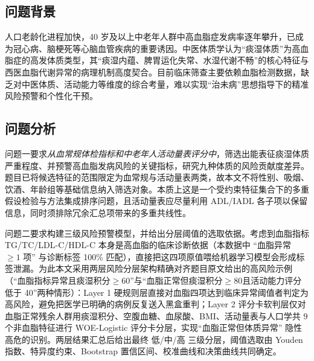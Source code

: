 \documentclass{MathorCupmodeling}
\begin{document}
\subsection{问题背景}

人口老龄化进程加快，40 岁及以上中老年人群中高血脂症发病率逐年攀升，已成为冠心病、脑梗死等心脑血管疾病的重要诱因。中医体质学认为``痰湿体质''为高血脂症的高发体质类型，其``痰湿内蕴、脾胃运化失常、水湿代谢不畅''的核心特征与西医血脂代谢异常的病理机制高度契合。目前临床筛查主要依赖血脂检测数据，缺乏对中医体质、活动能力等维度的综合考量，难以实现``治未病''思想指导下的精准风险预警和个性化干预。

\subsection{问题分析}

问题一要求\textit{从血常规体检指标和中老年人活动量表评分中}，筛选出能表征痰湿体质严重程度、并预警高血脂发病风险的关键指标，研究九种体质的风险贡献度差异。题目已将候选特征的范围限定为血常规与活动量表两类，故本文不将性别、吸烟、饮酒、年龄组等基础信息纳入筛选对象。本质上这是一个受约束特征集合下的多重假设检验与方法集成排序问题，且活动量表应尽量利用 ADL/IADL 各子项以保留信息，同时须排除冗余汇总项带来的多重共线性。

问题二要求构建三级风险预警模型，并给出分层阈值的选取依据。考虑到血脂指标 TG/TC/LDL-C/HDL-C 本身是高血脂的临床诊断依据（本数据中 ``血脂异常 $\ge 1$ 项'' 与诊断标签 100\% 匹配），直接把这四项原值喂给机器学习模型会形成标签泄漏。为此本文采用两层风险分层架构精确对齐题目原文给出的高风险示例（``血脂指标异常且痰湿积分$\ge 60$''与``血脂正常但痰湿积分$\ge 80$且活动能力评分低于 40''两种情形）：Layer 1 硬规则层直接对血脂四项达到临床异常阈值者判定为高风险，避免把医学已明确的病例反复送入黑盒重判；Layer 2 评分卡软判层仅对血脂正常残余人群用痰湿积分、空腹血糖、血尿酸、BMI、活动量表与人口学共 $9$ 个非血脂特征进行 WOE-Logistic 评分卡分层，实现``血脂正常但体质异常'' 隐性高危的识别。两层结果汇总后给出最终 低/中/高 三级分层，阈值选取由 Youden 指数、特异度约束、Bootstrap 置信区间、校准曲线和决策曲线共同确定。
\end{document}
